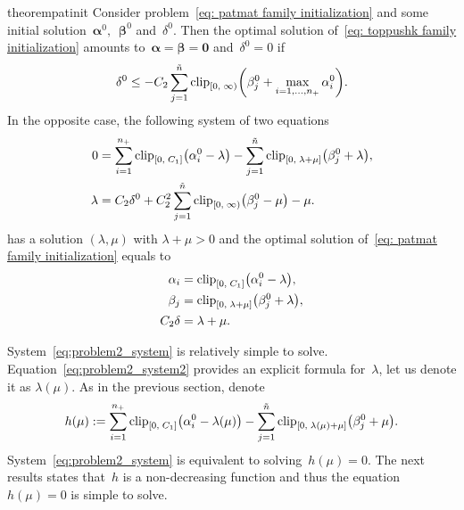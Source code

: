 \begin{restatable}{theorem}{patinit}\label{thm:problem2}
  Consider problem~\eqref{eq: patmat family initialization} and some initial solution~$\bm{\alpha}^0,$~$\bm{\beta}^0$ and~$\delta^0.$ Then the optimal solution of~\eqref{eq: toppushk family initialization} amounts to~$\bm{\alpha} = \bm{\beta} = \bm{0}$ and~$\delta^0 = 0$ if
  \begin{equation}\label{eq:problem2_cond}
    \delta^0 \le - C_2 \sum_{j = 1}^{\ntil} \clip[u]{0}{\infty}{\beta_j^0 + \max_{i=1,\dots,\npos} \alpha_i^0}.
  \end{equation}
  In the opposite case, the following system of two equations
  \begin{subequations}\label{eq:problem2_system}
    \begin{align}
    0
      & = \sum_{i=1}^{\npos} \clip{0}{C_1}{\alpha_i^0 - \lambda} - \sum_{j=1}^{\ntil} \clip{0}{\lambda + \mu}{\beta_j^0 + \lambda},
    \label{eq:problem2_system1} \\
    \lambda
      & = C_2 \delta^0 + C_2^2 \sum_{j=1}^{\ntil} \clip[u]{0}{\infty}{\beta_j^0 - \mu} - \mu.
    \label{eq:problem2_system2}
    \end{align}
  \end{subequations}
  has a solution $(\lambda,\mu)$ with $\lambda+\mu>0$ and the optimal solution of~\eqref{eq: patmat family initialization} equals to
  \begin{align*}
    \alpha_i & = \clip{0}{C_1}{\alpha_i^0 - \lambda}, \\
    \beta_j & = \clip{0}{\lambda + \mu}{\beta_j^0 + \lambda}, \\
    C_2 \delta &= \lambda + \mu.
  \end{align*}
\end{restatable}

System~\eqref{eq:problem2_system} is relatively simple to solve. Equation~\eqref{eq:problem2_system2} provides an explicit formula for~$\lambda$, let us denote it as $\lambda(\mu)$. As in the previous section, denote
\begin{equation}\label{eq:defin_f2}
  h(\mu) :=
    \sum_{i=1}^{\npos} \clip{0}{C_1}{\alpha_i^0 - \lambda(\mu)} - \sum_{j=1}^{\ntil} \clip{0}{\lambda(\mu) + \mu}{\beta_j^0 + \mu}.
\end{equation}
System~\eqref{eq:problem2_system} is equivalent to solving~$h(\mu) = 0$. The next results states that~$h$ is a non-decreasing function and thus the equation~$h(\mu) = 0$ is simple to solve.

